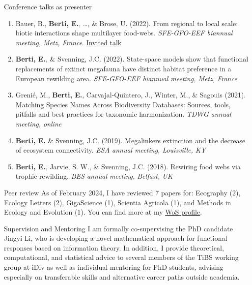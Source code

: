 \documentclass{resume} %
\begin{document}
\begin{rSection}{Conference talks as presenter}
\begin{enumerate}[leftmargin=0pt]
    \setcounter{enumi}{0}
    \itemsep-1ex
    \item{Bauer, B., \textbf{Berti, E.}, \dots, \& Brose, U. (2022). From regional to local scale: biotic interactions shape multilayer food-webs. \textit{SFE-GFO-EEF biannual meeting, Metz, France}. \underline{Invited talk}}
    \item{\textbf{Berti, E.}, \& Svenning, J.C. (2022). State-space models show that functional replacements of extinct megafauna have distinct habitat preference in a European rewilding area. \textit{SFE-GFO-EEF biannual meeting, Metz, France}}
    \item{Grenié, M., \textbf{Berti, E.}, Carvajal-Quintero, J., Winter, M., \& Sagouis (2021). Matching Species Names Across Biodiversity Databases: Sources, tools, pitfalls and best practices for taxonomic harmonization. \textit{TDWG annual meeting, online}}
    \item{\textbf{Berti, E.} \& Svenning, J.C. (2019). Megalinkers extinction and the decrease of ecosystem connectivity. \textit{ESA annual meeting, Louisville, KY}}
    \item{\textbf{Berti, E.}, Jarvie, S. W., \& Svenning, J.C. (2018). Rewiring food webs via trophic rewilding. \textit{BES annual meeting, Belfast, UK}}
\end{enumerate}
\end{rSection}

\begin{rSection}{Peer review}
As of February 2024, I have reviewed 7 papers for: Ecography (2), Ecology Letters (2), GigaScience (1), Scientia Agricola (1), and Methods in Ecology and Evolution (1). You can find more at my \href{https://www.webofscience.com/wos/author/record/2190178}{WoS profile}.
\end{rSection}

\begin{rSection}{Supervision and Mentoring}
I am formally co-supervising the PhD candidate Jingyi Li, who is developing a novel mathematical approach for functional responses based on information theory. 
In addition, I provide theoretical, computational, and statistical advice to several members of the TiBS working group at iDiv as well as individual mentoring for PhD students, advising especially on transferable skills and alternative career paths outside academia.
\end{rSection}
\end{document}
